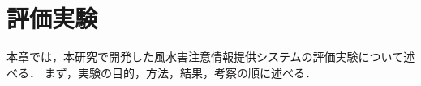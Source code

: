 \documentclass[a4paper,11pt,oneside,openany]{jsbook}
\begin{document}
\chapter{評価実験}
本章では，本研究で開発した風水害注意情報提供システムの評価実験について述べる．
まず，実験の目的，方法，結果，考察の順に述べる．







%
\end{document}
